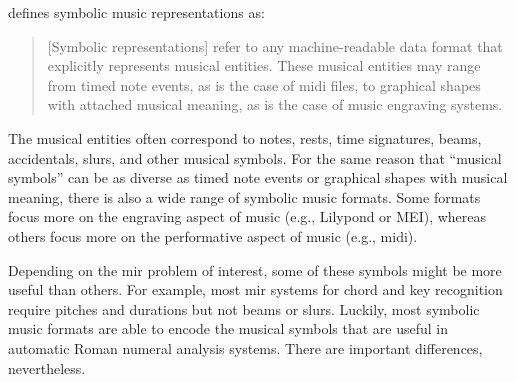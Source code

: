 

\textcite{muller2015music} defines symbolic music
representations as:

\begin{quote}
[Symbolic representations] refer to any machine-readable
data format that explicitly represents musical entities.
These musical entities may range from timed note events, as
is the case of \gls{midi} ﬁles, to graphical shapes with attached
musical meaning, as is the case of music engraving systems.
\end{quote}


The musical entities often correspond to notes, rests, time
signatures, beams, accidentals, slurs, and other musical
symbols. For the same reason that ``musical symbols'' can be
as diverse as timed note events or graphical shapes with
musical meaning, there is also a wide range of symbolic
music formats. Some formats focus more on the engraving
aspect of music (e.g., Lilypond or MEI), whereas others
focus more on the performative aspect of music (e.g., \gls{midi}).

Depending on the \gls{mir} problem of interest, some of these
symbols might be more useful than others. For example, most
\gls{mir} systems for chord and key recognition require pitches
and durations but not beams or slurs. Luckily, most symbolic
music formats are able to encode the musical symbols that
are useful in automatic Roman numeral analysis systems.
There are important differences, nevertheless.
